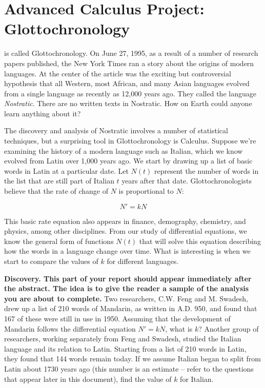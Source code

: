 \documentclass
[justified,nohyper]
{tufte-handout}
\begin{document}
\section{Advanced Calculus Project: Glottochronology}

 is called Glottochronology.
On June 27, 1995, as a result of a number of research papers published, the New
York Times ran a story about the origins of modern languages. At the center of
the article was the exciting but controversial hypothesis that all Western,
most African, and many Asian languages evolved from a single language as
recently as 12,000 years ago. They called the language \textit{Nostratic}.
There are no written texts in Nostratic. How on Earth could anyone learn
anything about it?

The discovery and analysis of Nostratic involves a number of statistical
techniques, but a surprising tool in Glottochronology is Calculus. Suppose
we're examining the history of a modern language such as Italian, which we
know evolved from Latin over 1,000 years ago. We start by drawing up a list
of basic words in Latin at a particular date. Let $N(t)$ represent the number
of words in the list that are still part of Italian $t$ years after that date. Glottochronologists believe that the rate of change of $N$ is proportional
to $N$:

\[
    N' = kN
\]

This basic rate equation also appears in finance, demography, chemistry, and
physics, among other disciplines. From our study of differential equations, we
know the general form of functions $N(t)$ that will solve this equation
describing how the words in a language change over time. What is interesting
is when we start to compare the values of $k$ for different languages.

\textbf{Discovery. This part of your report should appear immediately after
the abstract. The idea is to give the reader a sample of the analysis you are
about to complete.}
Two researchers, C.W. Feng and M. Swadesh, drew up a list
of 210 words of Mandarin, as written in A.D. 950, and found that 167 of these
were still in use in 1950. Assuming that the development of Mandarin follows
the differential equation $N'=kN$, what is $k$? Another group of researchers,
working separately from Feng and Swadesh, studied the Italian language and its
relation to Latin. Starting from a list of 210 words in Latin, they found that
144 words remain today. If we assume Italian began to split from Latin about
1730 years ago (this number is an estimate -- refer to the questions that
appear later in this document), find the value of $k$ for Italian.
\end{document}
